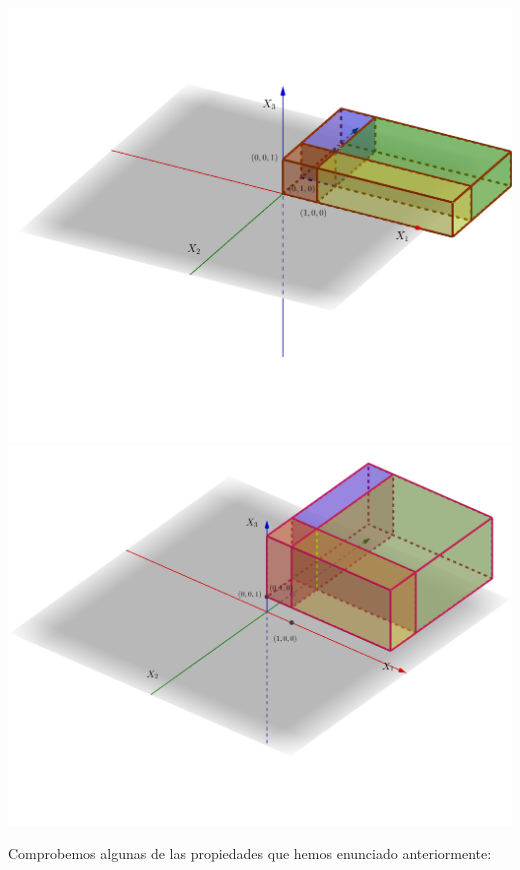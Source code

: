 \documentclass[]{book}
\begin{document}
\includegraphics{Images/Ej3DFxyz.png} \includegraphics{Images/Ej3DFxy2pis.png}

Comprobemos algunas de las propiedades que hemos enunciado anteriormente:
\end{document}
